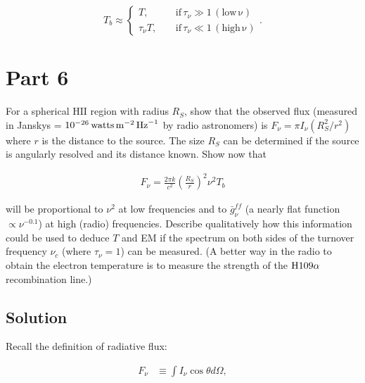\documentclass[12pt]{article}
\begin{document}
\begin{equation*}
\boxed{ 
T_b \approx
\left\{
\begin{aligned}
T,          ~~~~~& \mathrm{if}\,\tau_\nu \gg 1 \,\mathrm{(low\,\nu)} \\
\tau_\nu T, ~~~~~& \mathrm{if}\,\tau_\nu \ll 1 \,\mathrm{(high\,\nu)}
\end{aligned}
\right.
}.
\end{equation*}


\section*{Part 6}

For a spherical $\mathrm{HII}$ region with radius $R_S$, show that the observed flux (measured in Janskys = $10^{-26}\, {\rm watts}\,{\rm m}^{-2}\,{\rm Hz}^{-1}$ by radio astronomers) is $F_\nu = \pi I_\nu(R_S^2/r^2)$ where $r$ is the distance to the source. The size $R_S$ can be determined if the source is angularly resolved and its distance known. Show now that 

\begin{align} \label{eq:5}
F_\nu = \frac{2\pi k}{c^2}\left(\frac{R_S}{r}\right)^2 \nu^2 T_b
\end{align}

{\noindent}will be proportional to $\nu^2$ at low frequencies and to $\bar{g}_\nu^{ff}$ (a nearly flat function $\propto \nu^{-0.1}$) at high (radio) frequencies. Describe qualitatively how this information could be used to deduce $T$ and EM if the spectrum on both sides of the turnover frequency $\nu_c$ (where $\tau_\nu =1 $) can be measured. (A better way in the radio to obtain the electron temperature is to measure the strength of the ${\rm H109}\alpha$ recombination line.)


\subsection*{Solution}

Recall the definition of radiative flux:

\begin{equation*}
\begin{split}
    F_\nu &\equiv \int I_\nu \cos \theta d\Omega,
\end{split}
\end{equation*}
\end{document}

